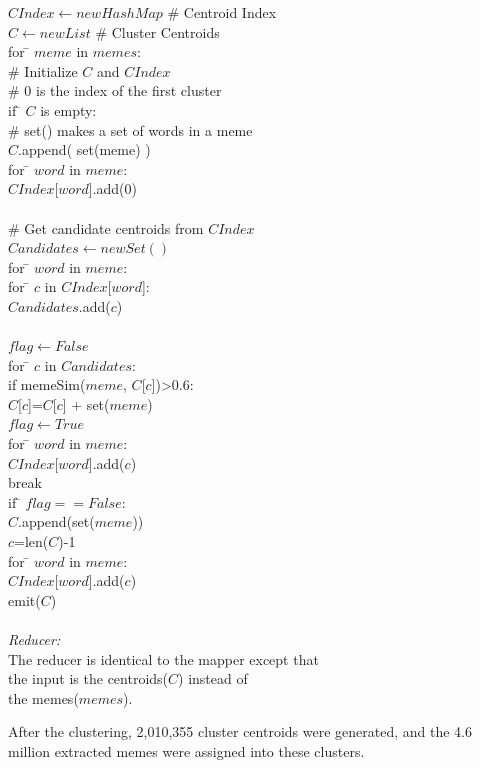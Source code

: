 \documentclass{sig-alternate}
\begin{document}
\begin{itemize}
\begin{centering}
\begin{tabbing}
$CIndex \leftarrow new HashMap$ \# Centroid Index\\
$C \leftarrow new List$ \# Cluster Centroids\\
for \= $meme$ in $memes$:\\
\>	\# Initialize $C$ and $CIndex$\\
\>	\# 0 is the index of the first cluster\\
\>	if \= $C$ is empty:\\
\>\>	\# set() makes a set of words in a meme\\
\>\>	$C$.append( set(meme) )\\
\>\>	for \= $word$ in $meme$:\\
\>\>\>		$CIndex$[$word$].add(0) \\
\\
\>	\# Get candidate centroids from $CIndex$\\
\>	$Candidates \leftarrow new Set()$\\
\>	for \= $word$ in $meme$:\\
\>\>		for \= $c$ in $CIndex$[$word$]:\\
\>\>\>		$Candidates$.add($c$)\\
\\
\>	$flag \leftarrow False$\\
\>	for \= $c$ in $Candidates$:\\
\>\>	if memeSim($meme$, $C$[$c$])>0.6:\\
\>\>\>		$C$[$c$]=$C$[$c$] + set($meme$)\\
\>\>\>	$flag \leftarrow True$\\
\>\>\>		for \= $word$ in $meme$:\\
\>\>\>\>		$CIndex$[$word$].add($c$) \\
\>\>\>		break
\\
\> if \= $flag == False$:\\
\>\>	$C$.append(set($meme$))\\
\>\>	$c$=len($C$)-1\\
\>\>		for \= $word$ in $meme$:\\
\>\>\>		$CIndex$[$word$].add($c$) \\
emit($C$)\\

\\
\emph{Reducer:}\\
\>The reducer is identical to the mapper except that \\
\> the input is the centroids($C$) instead of\\
\> the memes($memes$).\\

\end{tabbing}

\end{centering}

After the clustering, 2,010,355 cluster centroids were generated, and the 4.6 million extracted memes were assigned into these clusters.
 
\end{itemize}
\end{document}
